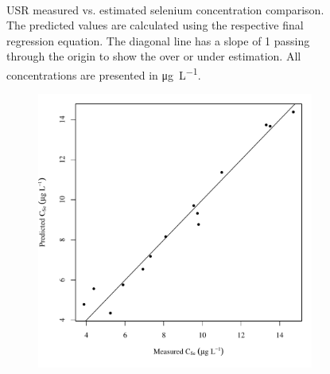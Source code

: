 \begin{landscape}
\begin{figure}
\begin{subfigure}{0.7\textwidth}
		\end{subfigure}\\
		\caption[USR measured vs. estimated selenium concentration comparison.]{USR measured vs. estimated selenium concentration comparison.  The predicted values are calculated using the respective final regression equation.  The diagonal line has a slope of 1 passing through the origin to show the over or under estimation.  All concentrations are presented in \si{\micro\gram\per\liter}.}
		\label{fig:concPredVMeas_US}
	\end{figure}
\end{landscape}

\subfiguremid
\begin{landscape}
	\begin{figure}
		\begin{subfigure}{0.7\textwidth}
			\centering
			\includegraphics[width=\tableCustomSize]{"Figures/Results_USR/Stochastic/Conc Model pred v meas U167"}
		\end{subfigure}%
		\begin{subfigure}{0.7\textwidth}
			\centering

\end{subfigure}
\end{figure}
\end{landscape}
